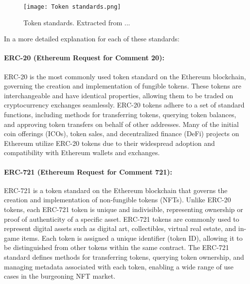 \begin{figure}[H]
    \texttt{[image: Token standards.png]}
    \centering
    \caption[Token standards]{Token standards. Extracted from ...}
    \label{fig:token_standards}
\end{figure}

In a more detailed explanation for each of these standards:

\paragraph{ERC-20 (Ethereum Request for Comment 20):}
ERC-20 is the most commonly used token standard on the Ethereum blockchain, governing the creation and implementation of fungible tokens. These tokens are interchangeable and have identical properties, allowing them to be traded on cryptocurrency exchanges seamlessly. ERC-20 tokens adhere to a set of standard functions, including methods for transferring tokens, querying token balances, and approving token transfers on behalf of other addresses. Many of the initial coin offerings (ICOs), token sales, and decentralized finance (DeFi) projects on Ethereum utilize ERC-20 tokens due to their widespread adoption and compatibility with Ethereum wallets and exchanges.

\paragraph{ERC-721 (Ethereum Request for Comment 721):}
ERC-721 is a token standard on the Ethereum blockchain that governs the creation and implementation of non-fungible tokens (NFTs). Unlike ERC-20 tokens, each ERC-721 token is unique and indivisible, representing ownership or proof of authenticity of a specific asset. ERC-721 tokens are commonly used to represent digital assets such as digital art, collectibles, virtual real estate, and in-game items. Each token is assigned a unique identifier (token ID), allowing it to be distinguished from other tokens within the same contract. The ERC-721 standard defines methods for transferring tokens, querying token ownership, and managing metadata associated with each token, enabling a wide range of use cases in the burgeoning NFT market.

